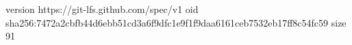 version https://git-lfs.github.com/spec/v1
oid sha256:7472a2cbfb44d6ebb51cd3a6f9dfc1e9f1f9daa6161ceb7532eb17ff8c54fc59
size 91
